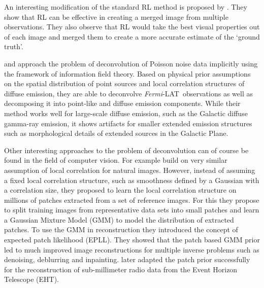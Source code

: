 \documentclass[twocolumn]{aastex631}
\newcommand{\fermi}{\textit{Fermi}-LAT~}
\newcommand{\todo}[1]{\textcolor{red}{TODO: #1}\PackageWarning{TODO:}{#1!}}
\begin{document}
    An interesting modification of the standard RL method is proposed by \cite{Ingaramo2014}. They show that RL can be effective in creating a merged image from multiple observations. They also observe that RL would take the best visual properties out of each image and merged them to create a more accurate estimate of the `ground truth'.
    
    \cite{Selig2015} and \cite{Pumpe2018} approach the problem of deconvolution of Poisson noise data implicitly using the framework of information field theory. Based on physical prior assumptions on the spatial distribution of point sources and local correlation structures of diffuse emission, they are able to deconvolve \fermi observations as well as decomposing it into point-like and diffuse emission components. While their method works well for large-scale diffuse emission, such as the Galactic diffuse gamma-ray emission, it shows artifacts for smaller extended emission structures such as morphological details of extended sources in the Galactic Plane.
    
    Other interesting approaches to the problem of deconvolution can of course be found in the field of computer vision. For example \cite{Zoran2011} build on very similar assumption of local correlation for natural images. However, instead of assuming a fixed local correlation structure, such as smoothness defined by a Gaussian with a correlation size, they proposed to learn the local correlation structure on millions of patches extracted from a set of reference images. For this they propose to split training images from representative data sets into small patches and learn a  Gaussian Mixture Model (GMM) to model the distribution of extracted patches. To use the GMM in reconstruction they introduced the concept of expected patch likelihood (EPLL). They showed that the patch based GMM prior led to much improved image reconstructions for multiple inverse problems such as denoising, deblurring and inpainting. \cite{Bouman2016} later adapted the patch prior successfully for the reconstruction of sub-millimeter radio data from the Event Horizon Telescope (EHT).
    
    
\end{document}

